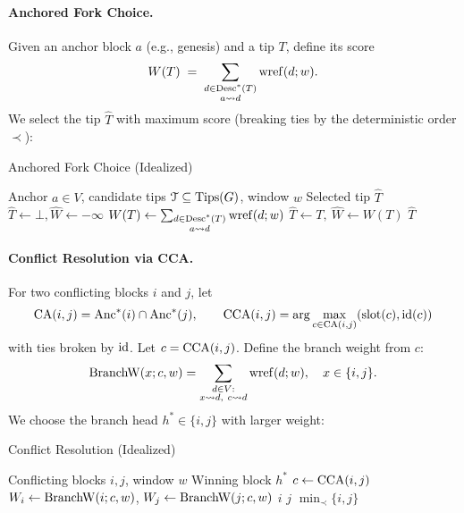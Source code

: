 \paragraph{Anchored Fork Choice.} Given an anchor block $a$ (e.g., genesis) and a tip $T$, define its score
\begin{equation*}
W(T)\;=\;\sum_{\substack{d\in\mathrm{Desc}^*(T)\\a\leadsto d}} \mathrm{wref}(d;w).
\end{equation*}
We select the tip $\hat{T}$ with maximum score (breaking ties by the deterministic order $\prec$):

\iffalse
\begin{algorithm}[H]
\caption{Anchored Fork Choice (Idealized)}
\label{alg:ideal-anchored-fc}
\begin{algorithmic}[1]
\Require Anchor $a\in V$, candidate tips $\mathcal{T}\subseteq \mathrm{Tips}(G)$, window $w$
\Ensure Selected tip $\hat{T}$
\State $\hat{T}\gets \bot, \hat{W}\gets -\infty$
  \State $W(T)\gets\sum_{\substack{d\in\mathrm{Desc}^*(T)\\a\leadsto d}} \mathrm{wref}(d;w)$
    \State $\hat{T}\gets T,\ \hat{W}\gets W(T)$
  \EndIf
\EndFor
\State \Return $\hat{T}$
\end{algorithmic}
\end{algorithm}

\paragraph{Conflict Resolution via CCA.} For two conflicting blocks $i$ and $j$, let 
\begin{equation*}
\mathrm{CA}(i,j)=\mathrm{Anc}^*(i)\cap \mathrm{Anc}^*(j),\qquad
\mathrm{CCA}(i,j)=\arg\max_{c\in \mathrm{CA}(i,j)}(\mathrm{slot}(c),\mathrm{id}(c))
\end{equation*}
with ties broken by $\mathrm{id}$. Let $c=\mathrm{CCA}(i,j)$. Define the branch weight from $c$:
\begin{equation*}
\mathrm{BranchW}(x; c, w) = \sum_{\substack{d\in V:\\ x\leadsto d,\ c\leadsto d}} \mathrm{wref}(d;w),\quad x\in\{i,j\}.
\end{equation*}
We choose the branch head $h^*\in\{i,j\}$ with larger weight:

\begin{algorithm}[H]
\caption{Conflict Resolution (Idealized)}
\label{alg:ideal-cca}
\begin{algorithmic}[1]
\Require Conflicting blocks $i,j$, window $w$
\Ensure Winning block $h^*$
\State $c \gets \mathrm{CCA}(i,j)$
\State $W_i\gets\mathrm{BranchW}(i;c,w)$, \quad $W_j\gets\mathrm{BranchW}(j;c,w)$
 \Return $i$
 \Return $j$
\Else \Return $\min\nolimits_{\prec}\{i,j\}$ 
\EndIf
\end{algorithmic}
\end{algorithm}


